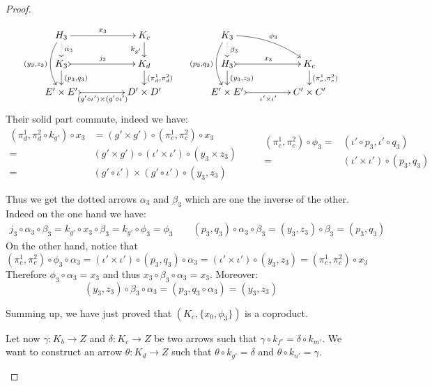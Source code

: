 \documentclass[a4paper,UKenglish,cleveref,pdftex,thm-restate,numberwithinsect]{lipics-v2021}
\begin{document}
\begin{proof}
\begin{enumerate}
 \[ \xymatrix@C=45pt@R=15pt{ H_3 \ar@{.>}[d]^{\alpha_3} \ar[r]^{x_3} \ar@/_.4cm/[dd]_{(y_3, z_3)} & K_c \ar[d]_{k_{g'}}& K_3 \ar@{.>}[d]^{\beta_3} \ar@/^.3cm$ $/[dr]^{\phi_3} \ar@/_.4cm/[dd]_{(p_3, q_3)}\\K_3 \ar@{>->}[r]^{j_3}  \ar[d]^{(p_3, q_3)} & K_d \ar[d]^{(\pi^1_d, \pi^2_d)} &  H_3 \ar@{>->}[r]^{x_3}  \ar[d]^{(y_3, z_3)} & K_c \ar[d]^{(\pi^1_c, \pi^2_c)}  \\
   E'\times E' \ar@{>->}[r]_-{(g'\circ \iota')\times (g'\circ \iota')} & D'\times D' & E'\times E' \ar@{>->}[r]_-{ \iota'\times  \iota'} & C'\times C'}\]
 Their solid part commute, indeed we have:
 \[\begin{split}
 	(\pi^1_d, \pi^2_d\circ k_{g'})\circ x_3&=(g'\times g')\circ (\pi^1_c, \pi^2_c) \circ x_3\\=&(g'\times g')\circ (\iota'\times \iota')\circ (y_3\times z_3)\\=&(g'\circ \iota') \times (g'\circ \iota')\circ (y_3, z_3)
 \end{split}\qquad \begin{split}
 (\pi^1_c, \pi^2_c)\circ \phi_3=&(\iota'\circ p_3, \iota' \circ q_3)\\=&
(\iota'\times \iota')\circ (p_3, q_3)\\& \end{split}\] 
 
Thus we get the dotted arrows $\alpha_3$ and $\beta_3$ which are one the inverse of the other. Indeed on the one hand we have:
\begin{align*}
j_3\circ \alpha_3\circ \beta_3=k_{g'}\circ x_3\circ \beta_3=k_{g'} \circ \phi_3=\phi_3  \qquad 
(p_3, q_3)\circ \alpha_3\circ \beta_3=(y_3, z_3)\circ \beta_3=(p_3, q_3) 
\end{align*}
 On the other hand, notice that
 \[(\pi^1_c, \pi^2_c)\circ \phi_3\circ \alpha_3 =(\iota'\times \iota')\circ (p_3, q_3)\circ \alpha_3= (\iota'\times \iota')\circ (y_3, z_3)=(\pi^1_c, \pi^2_c)\circ x_3\]
 Therefore $\phi_3\circ \alpha_3=x_3$ and thus $x_3\circ \beta_3\circ \alpha_3=x_3$. Moreover:
 \[(y_3, z_3)\circ \beta_3\circ \alpha_3=(p_3, q_3\circ \alpha_3)=(y_3, z_3)\]
 
 Summing up, we have just proved that $(K_c, \{x_0, \phi_3\})$ is a coproduct.
 
 
 Let now $\gamma\colon K_b\to Z$ and $\delta\colon K_c\to Z$ be two arrows such that $\gamma\circ k_{f'}=\delta\circ k_{m'}$. We want to construct an arrow $\theta\colon K_d\to Z$ such that $\theta\circ k_{g'}=\delta$ and $\theta\circ k_{n'}=\gamma$.	
 

\end{enumerate}
\end{proof}
\end{document}
